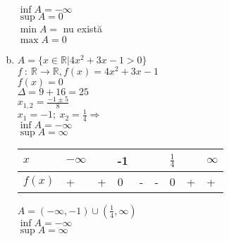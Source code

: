 \documentclass[a4paper, 12pt, notitlepage]{book}
\begin{document}
\begin{enumerate}[a.]
            $\inf A = -\infty$\\
            $\sup A = 0$\\
            $\min A =$ nu exist\u{a}\\
            $\max A = 0$

      \item $A = \{x \in \mathbb{R} \vert 4x^{2} +3x-1 > 0\}$\\
            $f\ :\ \mathbb{R} \to \mathbb{R}, f(x) = 4x^{2} +3x-1$\\
            $f(x) = 0$\\
            $\Delta = 9+16 = 25$\\
            $x_{1,2} = \frac{-1 \pm 5}{8}$\\
            $x_{1} = -1;\ x_{2} = \frac{1}{4} \Rightarrow $\\

            $\inf A = -\infty$\\
            $\sup A = \infty$\\

            \begin{table}[h]
              \begin{tabular}{l|llllllll}
                $x$    & $-\infty$ &   & -1 &   &   & $\frac{1}{4}$ &   & $\infty$  \\
                \hline
                $f(x)$ & +       & + & 0  & - & - & 0           & + & +
              \end{tabular}
            \end{table}

            $A = (-\infty, -1) \cup \left( \frac{1}{4}, \infty \right)$\\
            $\inf A = -\infty$\\
            $\sup A = \infty$
    \end{enumerate}
\end{document}
